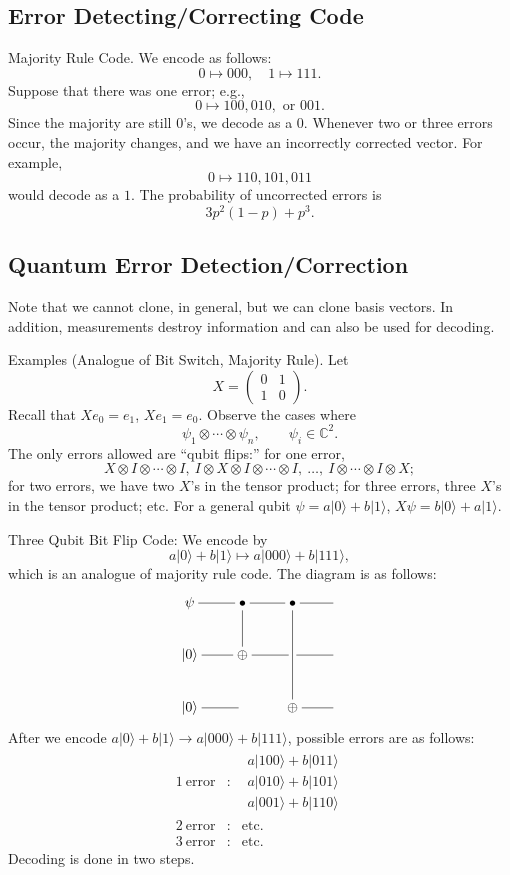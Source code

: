 \documentclass[12pt]{article}
\theoremstyle{definition}
\newcommand{\C}{\mathbb{C}}
\begin{document}
\subsection{Error Detecting/Correcting Code}

Majority Rule Code. We encode as follows:
\[
0 \mapsto 000, \quad 1 \mapsto 111.
\]
Suppose that there was one error; e.g.,
\[
0 \mapsto 100, 010, \text{ or } 001.
\]
Since the majority are still $0$'s, we decode as a $0$. Whenever two or three errors occur, the majority changes, and we have an incorrectly corrected vector. For example,
\[
0 \mapsto 110, 101, 011
\]
would decode as a $1$. The probability of uncorrected errors is
\[
3p^2(1-p)+p^3.
\]

\subsection{Quantum Error Detection/Correction}

Note that we cannot clone, in general, but we can clone basis vectors. In addition, measurements destroy information and can also be used for decoding.

Examples (Analogue of Bit Switch, Majority Rule). Let
\[
X=\begin{pmatrix}0 & 1\\ 1 & 0\end{pmatrix}.
\]
Recall that $Xe_0=e_1$, $Xe_1=e_0$. Observe the cases where
\[
\psi_1 \otimes \cdots \otimes \psi_n, \qquad \psi_i \in \C^2.
\]
The only errors allowed are ``qubit flips:'' for one error,
\[
X \otimes I \otimes \cdots \otimes I, \ I \otimes X \otimes I \otimes \cdots \otimes I, \ \ldots, \ I \otimes \cdots \otimes I \otimes X;
\]
for two errors, we have two $X$'s in the tensor product; for three errors, three $X$'s in the tensor product; etc.
For a general qubit $\psi=a|0\rangle+b|1\rangle$, $X\psi=b|0\rangle+a|1\rangle$.

Three Qubit Bit Flip Code: We encode by
\[
a|0\rangle+b|1\rangle \mapsto a|000\rangle+b|111\rangle,
\]
which is an analogue of majority rule code. The diagram is as follows:
\[
\xymatrix@C=2.2em@R=2.2em{
\psi \ar@{-}[r] & \bullet \ar@{-}[r] \ar@{-}[d] & \bullet \ar@{-}[r] \ar@{-}[dd] & \\
|0\rangle \ar@{-}[r] & \oplus \ar@{-}[r] & \ar@{-}[r] & \\
|0\rangle \ar@{-}[r] & & \oplus \ar@{-}[r] &
}
\]
After we encode $a|0\rangle+b|1\rangle \to a|000\rangle+b|111\rangle$, possible errors are as follows:
\[
\begin{array}{rcl}
1\ \text{error} & : & \begin{array}{l}
a|100\rangle+b|011\rangle \\
a|010\rangle+b|101\rangle \\
a|001\rangle+b|110\rangle
\end{array} \\
2\ \text{error} & : & \text{etc.} \\
3\ \text{error} & : & \text{etc.}
\end{array}
\]
Decoding is done in two steps.
\end{document}
